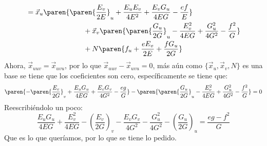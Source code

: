 \documentclass{homework}
\begin{document}
\begin{sol}
\begin{align*}
        &=\vec{x}_u\paren{\paren{\frac{E_v}{2E}}_u+\frac{E_uE_v}{4E^2}+\frac{E_vG_u}{4EG}-\frac{ef}{E}}\\
        &{} \qquad {} \qquad {} \qquad {} \qquad+\vec{x}_v\paren{\paren{\frac{G_u}{2G}}_u-\frac{E_v^2}{4EG}+\frac{G_u^2}{4G^2}-\frac{f^2}{G}}\\
        &{} \qquad {} \qquad {} \qquad {} \qquad+N\paren{f_u+\frac{eE_v}{2E}+\frac{fG_u}{2G}}
    \end{align*}
    Ahora, \(\vec{x}_{uuv}=\vec{x}_{uvu}\), por lo que \(\vec{x}_{uuv}-\vec{x}_{uvu}=0\), más aún como \(\{\vec{x}_u,\vec{x}_v,N\}\) es una base se tiene que los coeficientes son cero, específicamente se tiene que:
    \begin{equation*}
        \paren{-\paren{\frac{E_v}{2G}}_v+\frac{E_uG_u}{4EG}+\frac{E_vG_v}{4G^2}-\frac{eg}{G}}-\paren{\paren{\frac{G_u}{2G}}_u-\frac{E_v^2}{4EG}+\frac{G_u^2}{4G^2}-\frac{f^2}{G}}=0
    \end{equation*}
    Reescribiéndolo un poco:
    \begin{equation*}
        \frac{E_u G_u}{4EG} + \frac{E_v^2}{4EG} - \left( \frac{E_v}{2G} \right)_v - \frac{E_vG_v}{4G^2} - \frac{G_u^2}{4G^2} - \left( \frac{G_u}{2G} \right)_u=\frac{eg-f^2}{G}
    \end{equation*}
    Que es lo que queríamos, por lo que se tiene lo pedido.
\end{sol}
\end{document}
